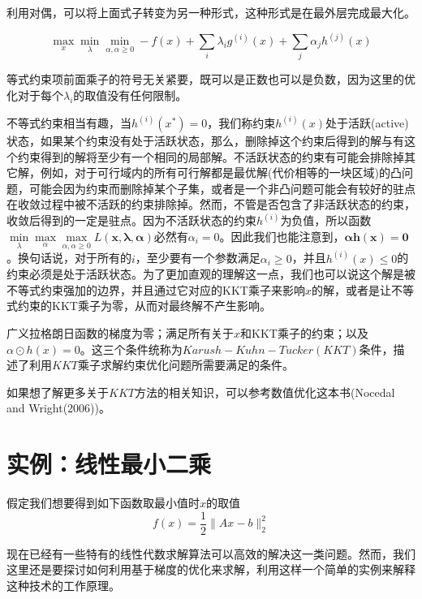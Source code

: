 利用对偶，可以将上面式子转变为另一种形式，这种形式是在最外层完成最大化。

\begin{equation}
\max\limits_{x} \min\limits_{\lambda} \min\limits_{\alpha,\alpha \geq 0} -f(x)+\sum_{i}\lambda_i g^{(i)}(x) + \sum_{j}\alpha_j h^{(j)}(x)
\end{equation}

等式约束项前面乘子的符号无关紧要，既可以是正数也可以是负数，因为这里的优化对于每个$\lambda_i$的取值没有任何限制。

不等式约束相当有趣，当$h^{(i)}(x^*) = 0$，我们称约束$h^{(i)}(x)$处于活跃(active)状态，如果某个约束没有处于活跃状态，那么，删除掉这个约束后得到的解与有这个约束得到的解将至少有一个相同的局部解。不活跃状态的约束有可能会排除掉其它解，例如，对于可行域内的所有可行解都是最优解(代价相等的一块区域)的凸问题，可能会因为约束而删除掉某个子集，或者是一个非凸问题可能会有较好的驻点在收敛过程中被不活跃的约束排除掉。然而，不管是否包含了非活跃状态的约束，收敛后得到的一定是驻点。因为不活跃状态的约束$h^{(i)}$为负值，所以函数$\min\limits_\lambda \max\limits_\alpha \max\limits_{\alpha, \alpha \geq 0}L( \bm {x, \lambda, \alpha} )$必然有$\alpha_i = 0$。因此我们也能注意到，$\bm{ \alpha h(x) = 0 }$。换句话说，对于所有的$i$，至少要有一个参数满足$\alpha_i \geq 0$，并且$h^{(i)}(x) \le 0$的约束必须是处于活跃状态。为了更加直观的理解这一点，我们也可以说这个解是被不等式约束强加的边界，并且通过它对应的KKT乘子来影响$x$的解，或者是让不等式约束的KKT乘子为零，从而对最终解不产生影响。

广义拉格朗日函数的梯度为零；满足所有关于$x$和KKT乘子的约束；以及$\alpha \odot h(x) = 0$。这三个条件统称为$Karush-Kuhn-Tucker(KKT)$条件，描述了利用$KKT$乘子求解约束优化问题所需要满足的条件。

如果想了解更多关于$KKT$方法的相关知识，可以参考数值优化这本书(Nocedal and Wright(2006))。

\section{实例：线性最小二乘}
\label{sec:4.5}

假定我们想要得到如下函数取最小值时$x$的取值
\begin{equation}
	f(x)=\frac{1}{2} \parallel Ax-b \parallel_{2}^{2}
\end{equation}

现在已经有一些特有的线性代数求解算法可以高效的解决这一类问题。然而，我们这里还是要探讨如何利用基于梯度的优化来求解，利用这样一个简单的实例来解释这种技术的工作原理。

